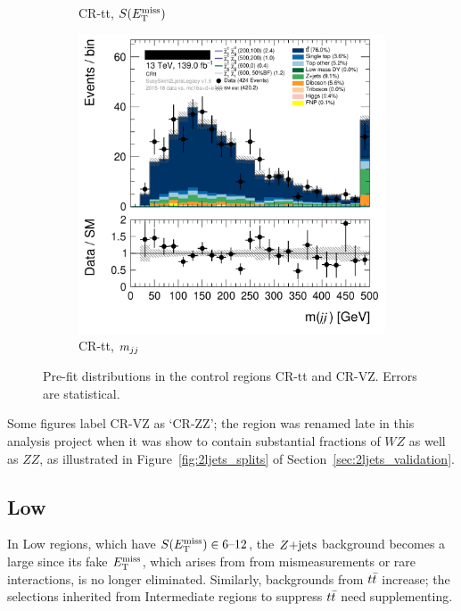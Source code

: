 \begin{figure}[tp]
\begin{subfigure}{0.48\textwidth}
\caption{CR-tt, $S(E_\mathrm{T}^\mathrm{miss})$}
\end{subfigure}
\hfill
\begin{subfigure}{0.48\textwidth}
\centering
\includegraphics[width=\textwidth]{figures/2ljets_def_mjj_CRtt.png}
\caption{CR-tt, $m_{jj}$}
\end{subfigure}
\caption[
Pre-fit distributions in the control regions CR-tt and CR-VZ
]{%
Pre-fit distributions in the control regions CR-tt and CR-VZ.
Errors are statistical.
}
\label{fig:2ljets_int_cr_region}
\end{figure}

Some figures label CR-VZ as `CR-ZZ'; the region was renamed late in this
analysis project when it was show to contain substantial fractions of $WZ$
as well as $ZZ$, as illustrated in Figure~\ref{fig:2ljets_splits} of
Section~\ref{sec:2ljets_validation}.


\FloatBarrier
\subsection{Low}
\label{sec:2ljets_low}

In Low regions, which have $S(E_\mathrm{T}^\mathrm{miss}) \in 6\textrm{--}12$, the $Z\mathrm{+jets}$
background becomes a large since its fake $E_\mathrm{T}^\mathrm{miss}$, which arises from
from mismeasurements or rare interactions, is no longer eliminated.
Similarly, backgrounds from $t\bar t$ increase; the selections inherited from
Intermediate regions to suppress $t\bar t$ need supplementing.

